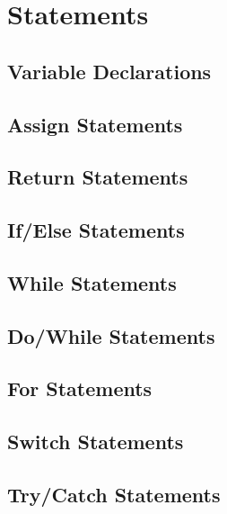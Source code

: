 \chapter{Statements}
\section{Variable Declarations}
\section{Assign Statements}
\section{Return Statements}
\section{If/Else Statements}
\section{While Statements}
\section{Do/While Statements}
\section{For Statements}
\section{Switch Statements}
\section{Try/Catch Statements}
